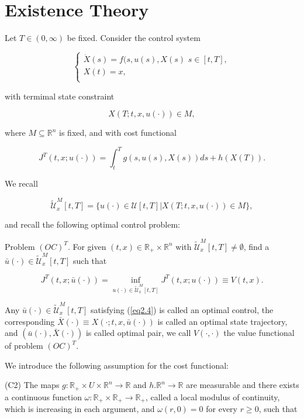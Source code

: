 \section{Existence Theory}
Let $T\in (0,\infty)$ be fixed. Consider the control system 

$$\left\{ \begin{array}{l}
	\dot{X}(s)=f(s,u(s),X(s)\,\,s\in [t,T], \\
	X(t)=x,\\
\end{array}
\right.$$

with termimal state constraint

$$X(T;t,x,u(\cdot))\in M,$$

where $M\subseteq \mathbb{R}^n$ is fixed, and with cost functional

\begin{equation*}
J^T(t,x;u(\cdot))=\int_{t}^{T}g(s,u(s),X(s))ds + h(X(T)).
\end{equation*}

We recall 

$$\tilde{\mathcal{U}}^M_x[t,T]=\{u(\cdot)\in\mathcal{U}[t,T] | X(T;t,x,u(\cdot))\in M\},$$

and recall the following optimal control problem:

Problem $(OC)^T$. For given $(t,x)\in \mathbb{R}_{+}\times \mathbb{R}^n$ with $\tilde{\mathcal{U}}^M_x[t,T]\neq\emptyset$, find a $\bar{u}(\cdot)\in \tilde{\mathcal{U}}^M_x[t,T]$ such that

\begin{equation}\label{eq2.4} 
J^T(t,x;\bar{u}(\cdot))=\inf_{u(\cdot)\in \tilde{\mathcal{U}}^M_x[t,T]} J^T(t,x;u(\cdot))\equiv V(t,x).
\end{equation}

Any $\bar{u}(\cdot)\in \tilde{\mathcal{U}}^M_x[t,T]$ satisfying (\ref{eq2.4}) is called an optimal control, the corresponding $\bar{X}(\cdot)\equiv X(\cdot;t,x,\bar{u}(\cdot))$ is called an optimal state trajectory, and $(\bar{u}(\cdot),\bar{X}(\cdot))$ is called optimal pair, we call $V(\cdot,\cdot)$ the value functional of problem $(OC)^T$.

We introduce the following assumption for the cost functional:

(C2) The maps $g:\mathbb{R}_{+}\times U\times \mathbb{R}^n\rightarrow \mathbb{R}$ and $h.\mathbb{R}^n\rightarrow \mathbb{R}$ are measurable and there exists a continuous function $\omega:\mathbb{R}_{+}\times\mathbb{R}_{+}\rightarrow \mathbb{R}_{+}$, called a local modulus of continuity, which is increasing in each argument, and $\omega(r,0)=0$ for every $r\geq 0$, such that 

